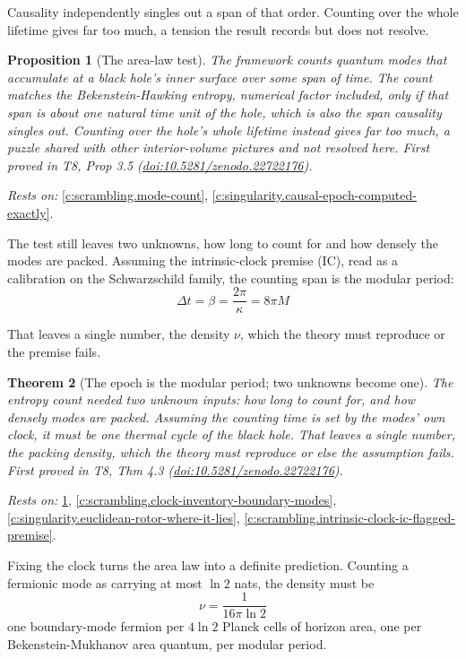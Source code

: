 \documentclass[11pt]{article}
\newtheorem{theorem}{Theorem}[section]
\newtheorem{proposition}[theorem]{Proposition}
\theoremstyle{definition}
\theoremstyle{plain}
\begin{document}
Causality independently singles out a span of that order. Counting over the whole lifetime gives far too much, a tension the result records but does not resolve.

\begin{proposition}[The area-law test]\label{c:scrambling.area-law-test}
The framework counts quantum modes that accumulate at a black hole's inner surface over some span of time. The count matches the Bekenstein-Hawking entropy, numerical factor included, only if that span is about one natural time unit of the hole, which is also the span causality singles out. Counting over the hole's whole lifetime instead gives far too much, a puzzle shared with other interior-volume pictures and not resolved here.
\emph{First proved in} T8, Prop 3.5 (\href{https://doi.org/10.5281/zenodo.22722176}{doi:10.5281/zenodo.22722176}).
\end{proposition}
\noindent\emph{Rests on:} \ref{c:scrambling.mode-count}, \ref{c:singularity.causal-epoch-computed-exactly}.

The test still leaves two unknowns, how long to count for and how densely the modes are packed. Assuming the intrinsic-clock premise (IC), read as a calibration on the Schwarzschild family, the counting span is the modular period: \[ \Delta t = \beta = \frac{2\pi}{\kappa} = 8\pi M \]

That leaves a single number, the density $\nu$, which the theory must reproduce or the premise fails.

\begin{theorem}[The epoch is the modular period; two unknowns become one]\label{c:scrambling.epoch-modular-period-two-unknowns-become}
The entropy count needed two unknown inputs: how long to count for, and how densely modes are packed. Assuming the counting time is set by the modes' own clock, it must be one thermal cycle of the black hole. That leaves a single number, the packing density, which the theory must reproduce or else the assumption fails.
\emph{First proved in} T8, Thm 4.3 (\href{https://doi.org/10.5281/zenodo.22722176}{doi:10.5281/zenodo.22722176}).
\end{theorem}
\noindent\emph{Rests on:} \ref{c:scrambling.area-law-test}, \ref{c:scrambling.clock-inventory-boundary-modes}, \ref{c:singularity.euclidean-rotor-where-it-lies}, \ref{c:scrambling.intrinsic-clock-ic-flagged-premise}.

Fixing the clock turns the area law into a definite prediction. Counting a fermionic mode as carrying at most $\ln 2$ nats, the density must be \[ \nu = \frac{1}{16\pi\ln 2} \] one boundary-mode fermion per $4\ln 2$ Planck cells of horizon area, one per Bekenstein-Mukhanov area quantum, per modular period.
\end{document}
